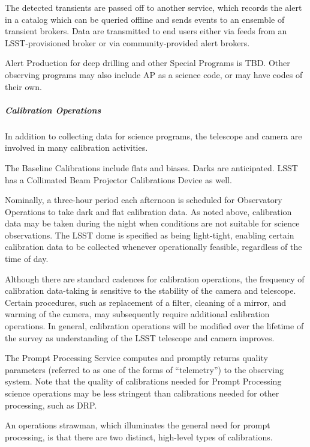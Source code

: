 The detected transients are passed off to another service, which
records the alert in a catalog which can be queried offline and sends
events to an ensemble of transient brokers. Data are transmitted to end
users either via feeds from an LSST-provisioned broker or via
community-provided alert brokers.

Alert Production for deep drilling and other Special Programs is TBD.  
Other observing programs
may also include AP as a science code, or may have codes of their own.

\subparagraph{Calibration Operations}

In addition to collecting data for science programs, the telescope and
camera are involved in many calibration activities. 

The Baseline Calibrations include flats and biases.  Darks are anticipated.  LSST has a Collimated Beam Projector Calibrations Device as well.  

Nominally, a
three-hour period each afternoon is scheduled for Observatory Operations
to take dark and flat calibration data. As noted above, calibration data
may be taken during the night when conditions are not suitable for
science observations. The LSST dome is specified as being light-tight,
enabling certain calibration data to be collected whenever operationally
feasible, regardless of the time of day.

Although there are standard cadences for calibration operations, the
frequency of calibration data-taking is sensitive to the stability of
the camera and telescope. Certain procedures, such as replacement of a
filter, cleaning of a mirror, and warming of the camera, may
subsequently require additional calibration operations. In general,
calibration operations will be modified over the lifetime of the
survey as understanding of the LSST telescope and camera improves.

The Prompt Processing Service computes and promptly returns quality
parameters (referred to as one of the forms of “telemetry”) to the observing system. Note
that the quality of calibrations needed for Prompt Processing science
operations may be less stringent than calibrations needed for other
processing, such as DRP.

An operations strawman, which illuminates the general need for prompt
processing, is that there are two distinct, high-level types of
calibrations.

